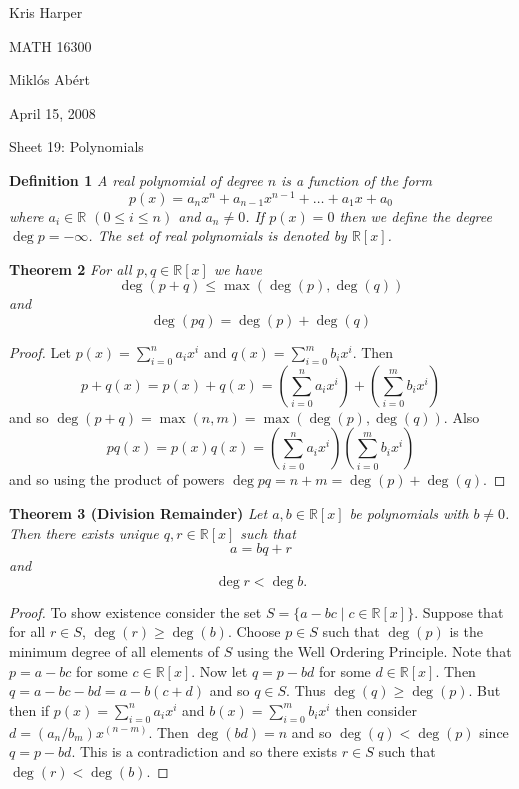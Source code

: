 \documentclass{article}
\begin{document}
\begin{flushright}
Kris Harper

MATH 16300

Mikl\'{o}s Ab\'{e}rt

April 15, 2008
\end{flushright}

\begin{flushleft}

\Large

Sheet 19: Polynomials\newline

\normalsize

\textbf{Definition 1}
\textsl{A real polynomial of degree $n$ is a function of the form
\[
p(x) = a_n x^n + a_{n-1} x^{n-1} + \dots + a_1 x + a_0
\]
where $a_i \in \mathbb{R}$ $(0 \leq i \leq n)$ and $a_n \neq 0$. If $p(x) = 0$ then we define the degree $\deg p = - \infty$. The set of real polynomials is denoted by $\mathbb{R}[x]$.}\newline

\textbf{Theorem 2}
\textsl{For all $p,q \in \mathbb{R}[x]$ we have
\[
\deg(p+q) \leq \max(\deg(p), \deg(q))
\]
and
\[
\deg(pq) = \deg(p) + \deg(q)
\]}
\begin{proof}
Let $p(x) = \sum_{i=0}^n a_i x^i$ and $q(x) = \sum_{i=0}^m b_i x^i$. Then
\[
p+q(x) = p(x) + q(x) = \left ( \sum_{i=0}^n a_i x^i \right ) + \left ( \sum_{i=0}^m b_i x^i \right )
\]
and so $\deg(p+q) = \max(n,m) = \max(\deg(p), \deg(q))$. Also
\[
pq(x) = p(x)q(x) = \left ( \sum_{i=0}^n a_i x^i \right ) \left ( \sum_{i=0}^m b_i x^i \right )
\]
and so using the product of powers $\deg pq = n+m = \deg(p) + \deg(q)$.
\end{proof}

\textbf{Theorem 3 (Division Remainder)}
\textsl{Let $a,b \in \mathbb{R}[x]$ be polynomials with $b \neq 0$. Then there exists unique $q,r \in \mathbb{R}[x]$ such that
\[
a = bq + r
\]
and
\[
\deg r < \deg b.
\]}
\begin{proof}
To show existence consider the set $S = \{a-bc \mid c \in \mathbb{R}[x]\}$. Suppose that for all $r \in S$, $\deg(r) \geq \deg(b)$. Choose $p \in S$ such that $\deg(p)$ is the minimum degree of all elements of $S$ using the Well Ordering Principle. Note that $p=a-bc$ for some $c \in \mathbb{R}[x]$. Now let $q = p-bd$ for some $d \in \mathbb{R}[x]$. Then $q = a-bc-bd=a-b(c+d)$ and so $q \in S$. Thus $\deg(q) \geq \deg(p)$. But then if $p(x) = \sum_{i=0}^n a_i x^i$ and $b(x) = \sum_{i=0}^m b_i x^i$ then consider $d = (a_n/b_m) x^{(n-m)}$. Then $\deg(bd) = n$ and so $\deg(q) < \deg(p)$ since $q = p-bd$. This is a contradiction and so there exists $r \in S$ such that $\deg(r) < \deg(b)$.\newline


\end{proof}
\end{flushleft}
\end{document}
